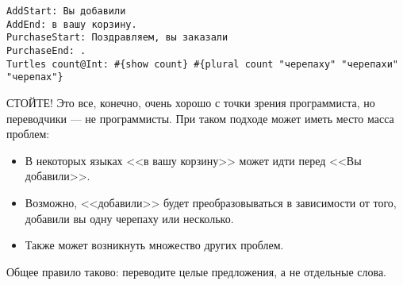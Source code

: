 \begin{lstlisting}
AddStart: Вы добавили
AddEnd: в вашу корзину.
PurchaseStart: Поздравляем, вы заказали
PurchaseEnd: .
Turtles count@Int: #{show count} #{plural count "черепаху" "черепахи" "черепах"}
\end{lstlisting}

СТОЙТЕ! Это все, конечно, очень хорошо с точки зрения программиста, но переводчики --- не программисты. При таком подходе может иметь место масса проблем:

\begin{itemize}
  \item В некоторых языках <<в вашу корзину>> может идти перед <<Вы добавили>>.
  \item Возможно, <<добавили>> будет преобразовываться в зависимости от того, добавили вы одну черепаху или несколько.
  \item Также может возникнуть множество других проблем. %
\end{itemize}

Общее правило таково: переводите целые предложения, а не отдельные слова.
